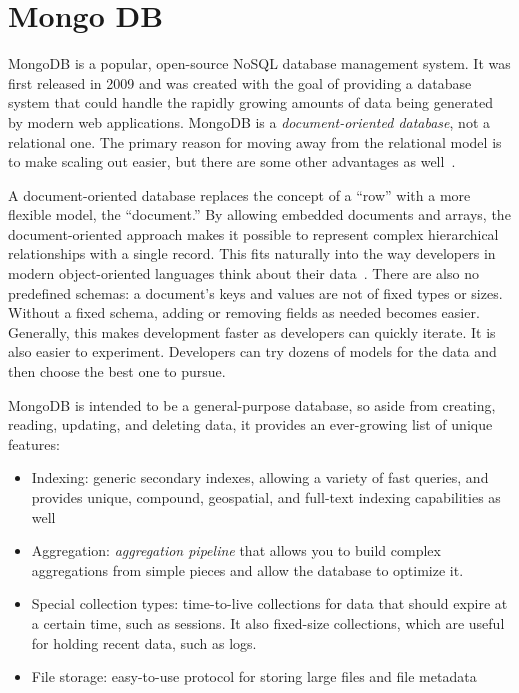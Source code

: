 \section{Mongo DB}
\label{sec:mongo}

MongoDB is a popular, open-source NoSQL database management system. 
It was first released in 2009 and was created with the goal of providing a database system 
that could handle the rapidly growing amounts of data being generated by modern web applications. 
MongoDB is a \emph{document-oriented database}, not a relational one. The primary reason
for moving away from the relational model is to make scaling out easier, but there are
some other advantages as well~\cite{HPMH13}.

A document-oriented database replaces the concept of a “row” with a more flexible
model, the “document.” By allowing embedded documents and arrays, the document-oriented approach 
makes it possible to represent complex hierarchical relationships
with a single record. This fits naturally into the way developers in modern object-oriented 
languages think about their data~\cite{HPMH13}.
There are also no predefined schemas: a document’s keys and values are not of fixed
types or sizes. Without a fixed schema, adding or removing fields as needed becomes
easier. Generally, this makes development faster as developers can quickly iterate. It is
also easier to experiment. Developers can try dozens of models for the data and then
choose the best one to pursue.

MongoDB is intended to be a general-purpose database, so aside from creating, reading,
updating, and deleting data, it provides an ever-growing list of unique features:
\begin{itemize}
    \item Indexing: generic secondary indexes, allowing a variety of fast queries,
    and provides unique, compound, geospatial, and full-text indexing capabilities as
    well
    \item Aggregation: \emph{aggregation pipeline} that allows you to build complex
    aggregations from simple pieces and allow the database to optimize it.
    \item Special collection types: time-to-live collections for data that should expire at a certain
    time, such as sessions. It also fixed-size collections, which are useful for
    holding recent data, such as logs.
    \item File storage: easy-to-use protocol for storing large files and file metadata
\end{itemize}


